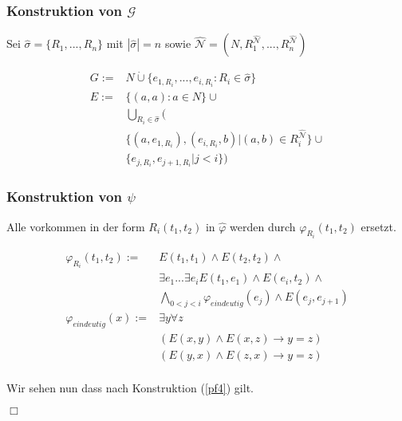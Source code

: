\documentclass[12pt]{article}
\begin{document}
\subsubsection*{Konstruktion von $\mathcal{G}$}
Sei $\hat\sigma = \{R_1, ..., R_n\}$ mit $|\hat\sigma|=n$ sowie $\hat{\mathcal{N}}
=(N,R_1^{\hat{\mathcal{N}}},...,R_n^{\hat{\mathcal{N}}})$


\begin{align}
  G :=&N\dot\cup \{e_{1,R_i},...,e_{i,R_i} : R_i\in\hat\sigma\}\\
  E :=&\{(a,a): a\in N\} \cup\\
  &\bigcup_{R_i\in\hat\sigma}(\\
  &\{(a,e_{1,R_i}), (e_{i,R_i}, b) | (a,b)\in R_i^{\hat{\mathcal{N}}}\} \cup\\
  &\{e_{j,R_i},e_{j+1,R_i}| j<i\})
\end{align}

\subsubsection*{Konstruktion von $\psi$}

Alle vorkommen in der form $R_i(t_1, t_2)$ in $\hat\varphi$ werden durch 
$\varphi_{R_i}(t_1,t_2)$ ersetzt.

\begin{align}
  \varphi_{R_i}(t_1,t_2) :=& E(t_1, t_1) \land E(t_2, t_2) \land\\
  &\exists e_1 ... \exists e_i E(t_1, e_1) \land E(e_i, t_2) \land\\
  &\bigwedge_{0<j<i} \varphi_{eindeutig}(e_j)\land E(e_j, e_{j+1})\\
  \varphi_{eindeutig}(x) := &\exists y \forall z \\
  & (E(x,y)\land E(x,z) \rightarrow y=z) \\
  & (E(y,x)\land E(z,x) \rightarrow y=z) \\
\end{align}

Wir sehen nun dass nach Konstruktion (\ref{pf4}) gilt.
\begin{flushright} $\Box$ \end{flushright}
\end{document}
